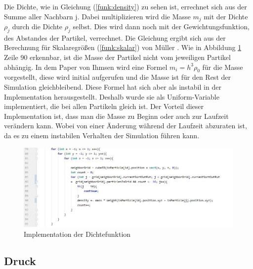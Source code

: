 \documentclass[intern,palatino]{cgBA}
\begin{document}
Die Dichte, wie in Gleichung (\ref{funk:density}) zu sehen ist, errechnet sich aus der Summe aller Nachbarn j. Dabei multiplizieren wird die Masse $m_j$ mit der Dichte $\rho_j$ durch die Dichte $\rho_j$ selbst. Dies wird dann noch mit der Gewichtungsfunktion, des Abstandes der Partikel, verrechnet. Die Gleichung ergibt sich aus der Berechnung für Skalaregrößen (\ref{funk:skalar}) von Müller \cite{muller2003particle}.
\newline\newline
Wie in Abbildung \ref{img:dichte} Zeile 90 erkennbar, ist die Masse der Partikel nicht vom jeweiligen Partikel abhängig. In dem Paper von Ihmsen \cite{ihmsen2014sph} wird eine Formel $m_i = h^3 \rho_0$ für die Masse vorgestellt, diese wird initial aufgerufen und die Masse ist für den Rest der Simulation gleichbleibend. Diese Formel hat sich aber als instabil in der Implementation herausgestellt. Deshalb wurde sie als Uniform-Variable implementiert, die bei allen Partikeln gleich ist. Der Vorteil dieser Implementation ist, dass man die Masse zu Beginn oder auch zur Laufzeit verändern kann. Wobei von einer Änderung während der Laufzeit abzuraten ist, da es zu einem instabilen Verhalten der Simulation führen kann.
\newline

\begin{figure}[H]
	\centering
	\includegraphics[width=1.35\columnwidth]{Bilder/dichte.jpg}
	\caption{Implementation der Dichtefunktion}
	\label{img:dichte}
\end{figure}


\subsection{Druck}\label{druch}
\end{document}
